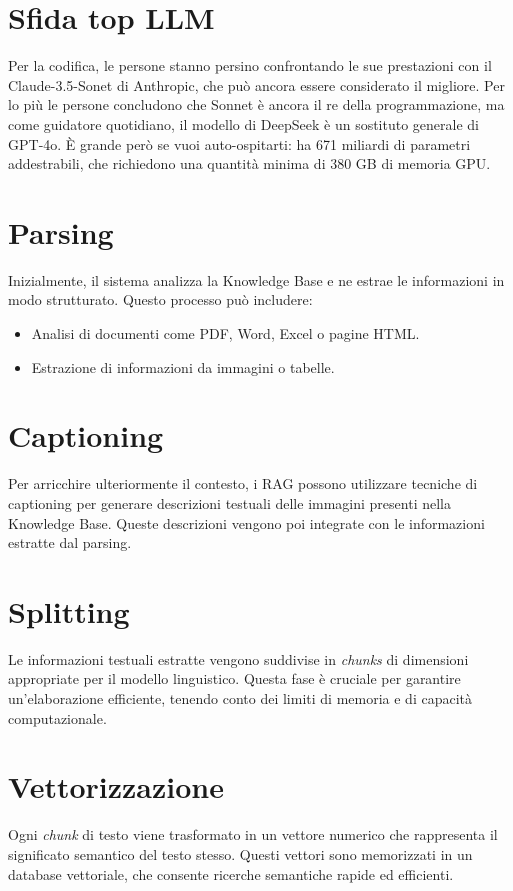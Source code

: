 \documentclass[12pt,a4paper,openright,twoside]{book}
\begin{document}
\section{Sfida top LLM}
 Per la codifica, le persone stanno persino confrontando le sue prestazioni con il Claude-3.5-Sonet di Anthropic, che può ancora essere considerato il migliore. Per lo più le persone concludono che Sonnet è ancora il re della programmazione, ma come guidatore quotidiano, il modello di DeepSeek è un sostituto generale di GPT-4o. È grande però se vuoi auto-ospitarti: ha 671 miliardi di parametri addestrabili, che richiedono una quantità minima di 380 GB di memoria GPU.

\section{Parsing}
Inizialmente, il sistema analizza la Knowledge Base e ne estrae le informazioni in modo strutturato. Questo processo pu\`o includere:
\begin{itemize}
    \item Analisi di documenti come PDF, Word, Excel o pagine HTML.
    \item Estrazione di informazioni da immagini o tabelle.
\end{itemize}

\section{Captioning}
Per arricchire ulteriormente il contesto, i RAG possono utilizzare tecniche di captioning per generare descrizioni testuali delle immagini presenti nella Knowledge Base. Queste descrizioni vengono poi integrate con le informazioni estratte dal parsing.

\section{Splitting}
Le informazioni testuali estratte vengono suddivise in \textit{chunks} di dimensioni appropriate per il modello linguistico. Questa fase \`e cruciale per garantire un'elaborazione efficiente, tenendo conto dei limiti di memoria e di capacit\`a computazionale.

\section{Vettorizzazione}
Ogni \textit{chunk} di testo viene trasformato in un vettore numerico che rappresenta il significato semantico del testo stesso. Questi vettori sono memorizzati in un database vettoriale, che consente ricerche semantiche rapide ed efficienti.
\end{document}
